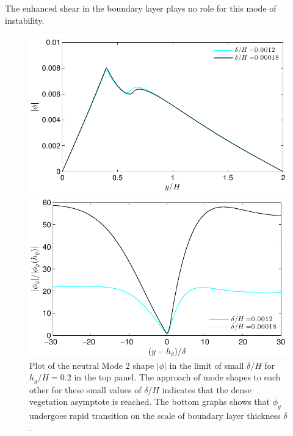 \documentclass[12pt]{report}   %
\newcommand{\hg}{h_g}
\newcommand{\Rey}{{R}}
\newcommand{\Ndg}{\tilde{N}_g}
\begin{document}
The enhanced shear in the boundary layer plays no role for this mode of instability.
\begin{figure}
\centerline{\includegraphics[width=1\linewidth]{AsymptoticPhiNoshear}}
\centerline{\includegraphics[width=0.95\linewidth]{AsymptoticPhiyNoshear}}
\caption{
Plot of the neutral Mode 2 shape $|\phi|$ in the limit of small $\delta/H$ for $\hg/H=0.2$ in the top panel.
The approach of mode shapes to each other for these small values of $\delta/H$ indicates that the dense vegetation asymptote is reached. 
The bottom graphs shows that $\phi_y$ undergoes rapid transition on the scale of boundary layer thickness $\delta$.
}
\label{Asymptotic_mode2}
\end{figure}
\end{document}
